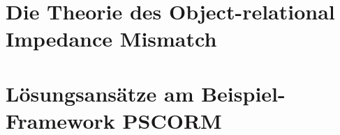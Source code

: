 \documentclass[11pt,a4paper]{book}
\title{\Title}
\author{\Author}
\date{\Date}
\renewcommand{\thepage}{\Roman{page}}
\theoremstyle{definition}
\theoremstyle{note}
\begin{document}



\cleardoublepage
\setcounter{page}{1}
\renewcommand{\thepage}{\arabic{page}}

\part{Die Theorie des Object-relational Impedance Mismatch}






















\part{Lösungsansätze am Beispiel-Framework PSCORM}





%












\end{document}
